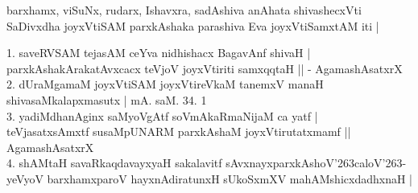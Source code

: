 \begin{entry}

\smallskip
\begin{shl}
barxhamx, viSuNx, rudarx, Ishavxra, sadAshiva anAhata shivashecxVti\\
SaDivxdha joyxVtiSAM parxkAshaka parashiva Eva joyxVtiSamxtAM iti |
\end{shl}
\smallskip
\begin{shl}
1. saveRVSAM tejasAM ceYva nidhishacx BagavAnf shivaH |\\
parxkAshakArakatAvxcacx teVjoV joyxVtiriti samxqqtaH || - AgamashAsatxrX\\
2. dUraMgamaM joyxVtiSAM joyxVtireVkaM tanemxV manaH shivasaMkalapxmasutx | mA. saM. 34. 1\\
3. yadiMdhanAginx saMyoVgAtf soVmAkaRmaNijaM ca yatf |\\
teVjasatxsAmxtf susaMpUNARM parxkAshaM joyxVtirutatxmamf || AgamashAsatxrX\\
4. shAMtaH savaRkaqdavayxyaH sakalavitf sAvxnayxparxkAshoV\char'263caloV\char'263-\\
yeVyoV barxhamxparoV hayxnAdiratunxH sUkoSxmXV mahAMshicxdadhxnaH |
\end{shl}
\medskip
{}
\end{entry}
